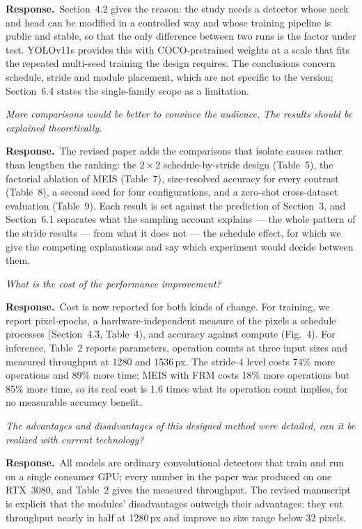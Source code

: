 \documentclass[11pt, a4paper]{article}
\newcommand{\point}[1]{\medskip\noindent\textit{#1}\par}
\newcommand{\reply}{\textbf{Response.}\ }
\begin{document}
\reply Section~4.2 gives the reason: the study needs a detector whose neck and
head can be modified in a controlled way and whose training pipeline is public and
stable, so that the only difference between two runs is the factor under test.
YOLOv11s provides this with COCO-pretrained weights at a scale that fits the
repeated multi-seed training the design requires. The conclusions concern
schedule, stride and module placement, which are not specific to the version;
Section~6.4 states the single-family scope as a limitation.

\point{More comparisons would be better to convince the audience. The results
should be explained theoretically.}

\reply The revised paper adds the comparisons that isolate causes rather than
lengthen the ranking: the $2\times2$ schedule-by-stride design (Table~5), the
factorial ablation of MEIS (Table~7), size-resolved accuracy for every contrast
(Table~8), a second seed for four configurations, and a zero-shot cross-dataset
evaluation (Table~9). Each result is set against the prediction of Section~3, and
Section~6.1 separates what the sampling account explains --- the whole pattern of
the stride results --- from what it does not --- the schedule effect, for which we
give the competing explanations and say which experiment would decide between
them.

\point{What is the cost of the performance improvement?}

\reply Cost is now reported for both kinds of change. For training, we report
pixel-epochs, a hardware-independent measure of the pixels a schedule processes
(Section~4.3, Table~4), and accuracy against compute (Fig.~4). For inference,
Table~2 reports parameters, operation counts at three input sizes and measured
throughput at 1280 and 1536\,px. The stride-4 level costs 74\% more operations
and 89\% more time; MEIS with FRM costs 18\% more operations but 85\% more time,
so its real cost is 1.6 times what its operation count implies, for no measurable
accuracy benefit.

\point{The advantages and disadvantages of this designed method were detailed, can
it be realized with current technology?}

\reply All models are ordinary convolutional detectors that train and run on a
single consumer GPU; every number in the paper was produced on one RTX~3080, and
Table~2 gives the measured throughput. The revised manuscript is explicit that the
modules' disadvantages outweigh their advantages: they cut throughput nearly in
half at 1280\,px and improve no size range below 32 pixels.
\end{document}
